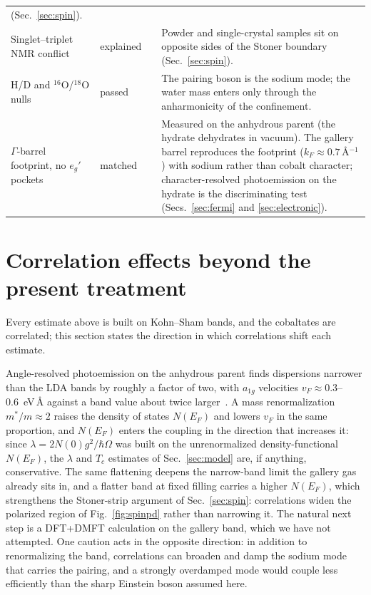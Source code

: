 \documentclass[aps,10pt,preprint,superscriptaddress,floatfix]{revtex4-2}
\begin{document}
\begin{table}[t]
\begin{tabular}{@{}p{4.7cm}p{1.4cm}p{1.9cm}p{7.3cm}@{}}
      (Sec.~\ref{sec:spin}).\\
    Singlet--triplet NMR conflict & explained & \cite{Sakurai2015} &
      Powder and single-crystal samples sit on opposite sides of the Stoner boundary
      (Sec.~\ref{sec:spin}).\\
    H/D and $^{16}$O/$^{18}$O nulls & passed & \cite{Jin2003,Yokoi2008} &
      The pairing boson is the sodium mode; the water mass enters only through the anharmonicity
      of the confinement.\\
    $\Gamma$-barrel footprint, no $e_g'$ pockets & matched & \cite{Geck2007} &
      Measured on the anhydrous parent (the hydrate dehydrates in vacuum). The gallery barrel
      reproduces the footprint ($k_F\approx0.7$\,\AA$^{-1}$) with sodium rather than cobalt
      character; character-resolved photoemission on the hydrate is the discriminating test
      (Secs.~\ref{sec:fermi} and \ref{sec:electronic}).\\
    \bottomrule
  \end{tabular}
\end{table}

\FloatBarrier
\section{Correlation effects beyond the present treatment}
\label{sec:correlations}

Every estimate above is built on Kohn--Sham bands, and the cobaltates are correlated; this section
states the direction in which correlations shift each estimate.

Angle-resolved photoemission on the anhydrous parent finds dispersions narrower than the LDA bands
by roughly a factor of two, with $a_{1g}$ velocities $v_F\approx0.3$--0.6~eV\,\AA{} against a band value about twice
larger~\cite{Geck2007}. A mass renormalization $m^\ast/m\approx2$ raises the density of states
$N(E_F)$ and lowers $v_F$ in the same proportion, and $N(E_F)$ enters the coupling in the direction that
increases it: since $\lambda=2N(0)g^2/\hbar\Omega$ was built on the unrenormalized
density-functional $N(E_F)$, the $\lambda$ and $T_c$ estimates of Sec.~\ref{sec:model} are, if
anything, conservative. The same flattening deepens the narrow-band limit the gallery gas already
sits in, and a flatter band at fixed filling carries a higher $N(E_F)$, which strengthens the
Stoner-strip argument of Sec.~\ref{sec:spin}: correlations widen the polarized region of
Fig.~\ref{fig:spinpd} rather than narrowing it. The natural next step is a DFT+DMFT calculation on
the gallery band, which we have not attempted. One caution acts in the opposite direction: in
addition to renormalizing the band, correlations can broaden and damp the sodium mode that carries
the pairing, and a
strongly overdamped mode would couple less efficiently than the sharp Einstein boson assumed here.
\end{document}
